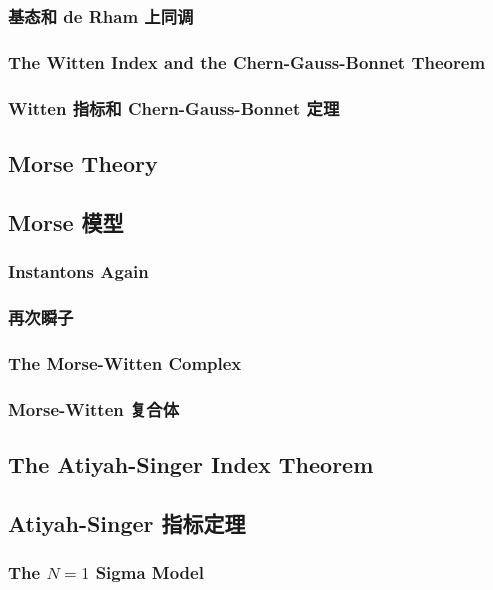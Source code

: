 \documentclass{article}
\begin{document}
\begin{paracol}{2}
\subsubsection*{基态和 de Rham 上同调}
\switchcolumn*

\subsubsection{The Witten Index and the Chern-Gauss-Bonnet Theorem}
\switchcolumn
\subsubsection*{Witten 指标和 Chern-Gauss-Bonnet 定理}
\switchcolumn*

\subsection{Morse Theory}
\switchcolumn
\subsection*{Morse 模型}
\switchcolumn*

\subsubsection{Instantons Again}
\switchcolumn
\subsubsection*{再次瞬子}
\switchcolumn*

\subsubsection{The Morse-Witten Complex}
\switchcolumn
\subsubsection*{Morse-Witten 复合体}
\switchcolumn*

\subsection{The Atiyah-Singer Index Theorem}
\switchcolumn
\subsection*{Atiyah-Singer 指标定理}
\switchcolumn*

\subsubsection{The $N = 1$ Sigma Model}
\switchcolumn

\end{paracol}
\end{document}
